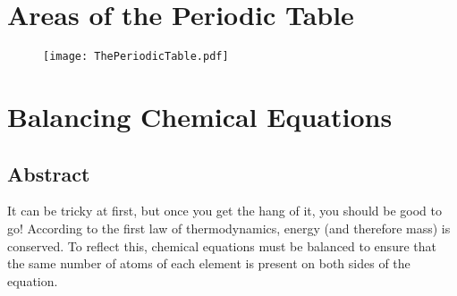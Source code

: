 \documentclass[10pt, roman]{article}
\begin{document}
\section{Areas of the Periodic Table}
\begin{figure}[ht!]
\centering
\texttt{[image: ThePeriodicTable.pdf]}
\label{overflow}
\end{figure}
\section{Balancing Chemical Equations}
\subsection{Abstract}
It can be tricky at first, but once you get the hang of it, you should be good to go!
According to the first law of thermodynamics, energy (and therefore mass) is conserved.
To reflect this, chemical equations must be balanced to ensure that the same number of atoms of each element is present on both sides of the equation.
\end{document}
